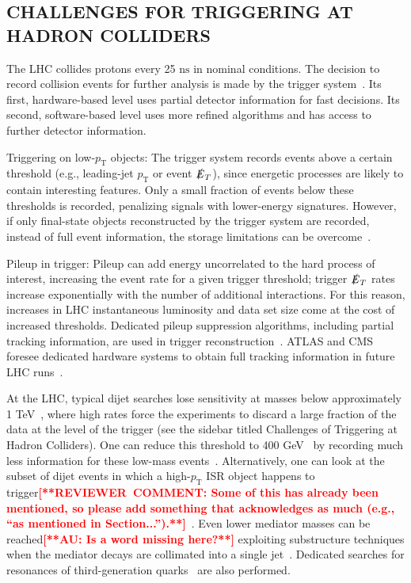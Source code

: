 \documentclass{ar-1col}
\newcommand{\pt}{\ensuremath{p_\mathrm{T}}\xspace}
\newcommand{\MET}{\ensuremath{\slashed{E}_T}\xspace}
\begin{document}
\begin{textbox}
\section{CHALLENGES FOR TRIGGERING AT HADRON COLLIDERS}

\noindent The LHC collides protons every 25 $\mathrm{ns}$ in nominal
conditions. The decision to record collision events for further
analysis is made by the trigger
system~\cite{Smith:2016vcs,Aaboud:2016leb,Khachatryan:2016bia}.
Its first, hardware-based level uses partial detector information
for fast decisions. Its second, software-based level uses more
refined algorithms and has access to further detector information.

{Triggering on low-\pt objects}: The trigger system records
events above a certain threshold (e.g., leading-jet \pt or event
\MET), since energetic processes are likely to contain interesting
features. Only a small fraction of events below these thresholds
is recorded, penalizing signals with lower-energy signatures.
However, if only final-state objects reconstructed by the trigger
system are recorded, instead of full event information, the
storage limitations can be
overcome~\cite{Aaij:2016rxn,CMS-PAS-EXO-16-056,Aaboud:2016leb}.

{{Pileup} in trigger}: Pileup can add energy
uncorrelated to the hard process of interest, increasing the event
rate for a given trigger threshold; trigger \MET rates increase
exponentially with the number of additional interactions. For this
reason, increases in LHC instantaneous luminosity and data set size
come at the cost of increased thresholds. Dedicated pileup
suppression algorithms, including partial tracking information, are
used in trigger
reconstruction~\cite{CMS:2014ata,ATLAS-CONF-2014-019}. ATLAS and
CMS foresee dedicated hardware systems to obtain full tracking
information in future LHC
runs~\cite{Shochet:2013gaw,1748-0221-6-12-C12065}.
\end{textbox}

At the LHC, typical dijet searches lose sensitivity at masses
below approximately 1 TeV~\cite{An:2012ue,Dobrescu:2013coa}, where high
rates force the experiments to discard a large fraction of the
data at the level of the trigger (see the sidebar titled Challenges of Triggering at Hadron Colliders). One can reduce this threshold to 400
GeV~\cite{CMS-PAS-EXO-16-056,ATLAS:2016xiv} by recording much less
information for these low-mass
events~\cite{Aaij:2016rxn,CMS-PAS-EXO-16-056,Aaboud:2016leb}.
Alternatively, one can look at the subset of dijet events in which a
high-\pt{} ISR object happens to
trigger\textbf{\textcolor{red}{[**REVIEWER\ COMMENT: Some of this has already been mentioned, so please add something that acknowledges as much (e.g., ``as mentioned in Section...'').**]}}~\cite{ATLAS:2016bvn,Sirunyan:2017nvi}. Even lower mediator
masses can be reached\textbf{\textcolor{red}{[**AU: Is a word missing here?**]}} exploiting substructure techniques when the
mediator decays are collimated into a single
jet~\cite{Sirunyan:2017nvi,Aaboud:2018zba}. Dedicated searches for
resonances of third-generation
quarks~\cite{lowMassDiB,CMS-PAS-HIG-16-025,Aaboud:2017hnm} are
also performed.
\end{document}
